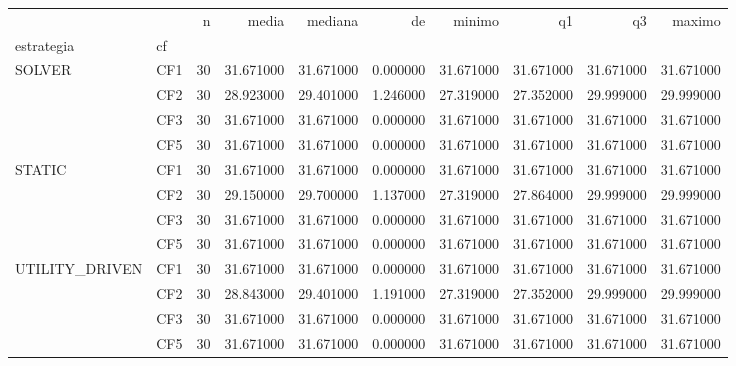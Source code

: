 \begin{tabular}{llrrrrrrrr}
\toprule
 &  & n & media & mediana & de & minimo & q1 & q3 & maximo \\
estrategia & cf &  &  &  &  &  &  &  &  \\
\midrule
\multirow[t]{4}{*}{SOLVER} & CF1 & 30 & 31.671000 & 31.671000 & 0.000000 & 31.671000 & 31.671000 & 31.671000 & 31.671000 \\
 & CF2 & 30 & 28.923000 & 29.401000 & 1.246000 & 27.319000 & 27.352000 & 29.999000 & 29.999000 \\
 & CF3 & 30 & 31.671000 & 31.671000 & 0.000000 & 31.671000 & 31.671000 & 31.671000 & 31.671000 \\
 & CF5 & 30 & 31.671000 & 31.671000 & 0.000000 & 31.671000 & 31.671000 & 31.671000 & 31.671000 \\
\cline{1-10}
\multirow[t]{4}{*}{STATIC} & CF1 & 30 & 31.671000 & 31.671000 & 0.000000 & 31.671000 & 31.671000 & 31.671000 & 31.671000 \\
 & CF2 & 30 & 29.150000 & 29.700000 & 1.137000 & 27.319000 & 27.864000 & 29.999000 & 29.999000 \\
 & CF3 & 30 & 31.671000 & 31.671000 & 0.000000 & 31.671000 & 31.671000 & 31.671000 & 31.671000 \\
 & CF5 & 30 & 31.671000 & 31.671000 & 0.000000 & 31.671000 & 31.671000 & 31.671000 & 31.671000 \\
\cline{1-10}
\multirow[t]{4}{*}{UTILITY_DRIVEN} & CF1 & 30 & 31.671000 & 31.671000 & 0.000000 & 31.671000 & 31.671000 & 31.671000 & 31.671000 \\
 & CF2 & 30 & 28.843000 & 29.401000 & 1.191000 & 27.319000 & 27.352000 & 29.999000 & 29.999000 \\
 & CF3 & 30 & 31.671000 & 31.671000 & 0.000000 & 31.671000 & 31.671000 & 31.671000 & 31.671000 \\
 & CF5 & 30 & 31.671000 & 31.671000 & 0.000000 & 31.671000 & 31.671000 & 31.671000 & 31.671000 \\
\cline{1-10}
\bottomrule
\end{tabular}
